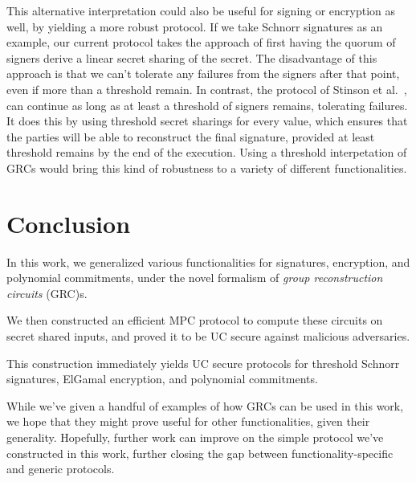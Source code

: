 This alternative interpretation could also be useful
for signing or encryption as well, by yielding a more robust protocol.
If we take Schnorr signatures as an example,
our current protocol takes the approach of first having the quorum
of signers derive a linear secret sharing of the secret.
The disadvantage of this approach is that we can't tolerate
any failures from the signers after that point,
even if more than a threshold remain.
In contrast, the protocol of Stinson et al.~\cite{stinson_provably_2001},
can continue as long as at least a threshold of signers
remains, tolerating failures.
It does this by using threshold secret sharings for every value,
which ensures that the parties will be able to reconstruct
the final signature, provided at least threshold remains
by the end of the execution.
Using a threshold interpetation of GRCs would bring this
kind of robustness to a variety of different functionalities.

\section{Conclusion}

In this work, we generalized various functionalities for
signatures, encryption, and polynomial commitments,
under the novel formalism of \emph{group reconstruction circuits} (GRC)s.

We then constructed an efficient MPC protocol to compute these circuits
on secret shared inputs, and proved it to be UC secure against
malicious adversaries.

This construction immediately yields UC secure protocols for threshold Schnorr
signatures, ElGamal encryption, and polynomial commitments.

While we've given a handful of examples of how GRCs can be used
in this work, we hope that they might prove useful for other functionalities,
given their generality.
Hopefully, further work can improve on the simple protocol we've
constructed in this work, further closing the gap between
functionality-specific and generic protocols.


\small 

